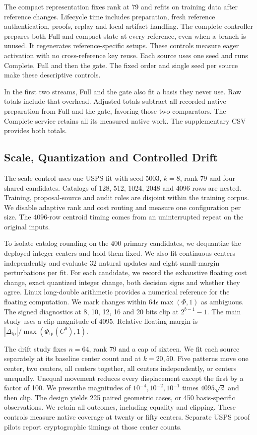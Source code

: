 \documentclass[5p,times,twocolumn]{elsarticle}
\begin{document}
The compact representation fixes rank at 79 and refits on training
data after reference changes. Lifecycle time includes preparation,
fresh reference authentication, proofs, replay and local artifact
handling. The complete controller prepares both Full and compact
state at every reference, even when a branch is unused. It regenerates
reference-specific setups. These controls measure eager activation with no cross-reference key reuse. Each source uses one seed and runs
Complete, Full and then the gate. The fixed order and single seed
per source make these descriptive controls.

In the first two streams, Full and the gate also fit a basis they
never use. Raw totals include that overhead. Adjusted totals subtract
all recorded native preparation from Full and the gate, favoring
those two comparators. The Complete service retains all its measured
native work. The supplementary CSV provides both totals.

\subsection{Scale, Quantization and Controlled Drift}
The scale control uses one USPS fit with seed 5003, $k=8$, rank 79 and
four shared candidates. Catalogs of 128, 512, 1024, 2048 and 4096 rows
are nested. Training, proposal-source and audit roles are disjoint
within the training corpus. We disable adaptive rank and cost routing
and measure one configuration per size. The 4096-row centroid timing
comes from an uninterrupted repeat on the original inputs.

To isolate catalog rounding on the 400 primary candidates, we
dequantize the deployed integer centers and hold them fixed. We also
fit continuous centers independently and evaluate 32 natural updates
and eight small-margin perturbations per fit. For each candidate, we
record the exhaustive floating cost change, exact quantized integer
change, both decision signs and whether they agree. Linux long-double
arithmetic provides a numerical reference for the floating computation.
We mark changes within $64\epsilon\max(\Phi,1)$ as ambiguous. The signed
diagnostics at 8, 10, 12, 16 and 20 bits clip at $2^{b-1}-1$. The main
study uses a clip magnitude of 4095. Relative floating margin is
$|\Delta_{\mathrm{fp}}|/\max(\Phi_{\mathrm{fp}}(C^0),1)$.

The drift study fixes $n=64$, rank 79 and a cap of sixteen. We fit
each source separately at its baseline center count and at $k=20,50$.
Five patterns move one center, two centers, all centers together,
all centers independently, or centers unequally. Unequal movement
reduces every displacement except the first by a factor of 100.
We prescribe magnitudes of $10^{-4},10^{-2},10^{-1}$ times $4095\sqrt d$
and then clip. The design yields 225 paired geometric cases, or 450
basis-specific observations. We retain all outcomes, including
equality and clipping. These controls measure native coverage at
twenty or fifty centers. Separate USPS proof pilots report
cryptographic timings at those center counts.
\end{document}
